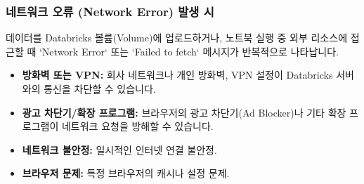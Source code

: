 \documentclass[11pt,a4paper]{article}
\begin{document}
\subsubsection*{네트워크 오류 (Network Error) 발생 시}
\begin{tcolorbox}[warningbox={증상}]
데이터를 Databricks 볼륨(Volume)에 업로드하거나, 노트북 실행 중 외부 리소스에 접근할 때 `Network Error` 또는 `Failed to fetch` 메시지가 반복적으로 나타납니다.
\end{tcolorbox}

\begin{tcolorbox}[summarybox={원인 가설}]
\begin{itemize}
    \item \textbf{방화벽 또는 VPN:} 회사 네트워크나 개인 방화벽, VPN 설정이 Databricks 서버와의 통신을 차단할 수 있습니다.
    \item \textbf{광고 차단기/확장 프로그램:} 브라우저의 광고 차단기(Ad Blocker)나 기타 확장 프로그램이 네트워크 요청을 방해할 수 있습니다.
    \item \textbf{네트워크 불안정:} 일시적인 인터넷 연결 불안정.
    \item \textbf{브라우저 문제:} 특정 브라우저의 캐시나 설정 문제.
\end{itemize}
\end{tcolorbox}
\end{document}

